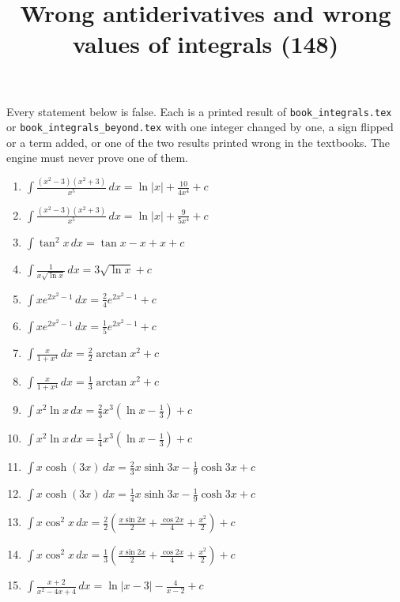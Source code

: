\documentclass[11pt,a4paper]{article}
\title{Wrong antiderivatives and wrong values of integrals (148)}
\author{}
\date{}
\begin{document}
\maketitle
Every statement below is false. Each is a printed result of \texttt{book\_integrals.tex} or \texttt{book\_integrals\_beyond.tex} with one integer changed by one, a sign flipped or a term added, or one of the two results printed wrong in the textbooks. The engine must never prove one of them.

\begin{enumerate}
\item $\displaystyle \int \frac{\left(x^{2} - 3\right)\left(x^{2} + 3\right)}{x^{5}} \, dx = \ln|x| + \frac{10}{4x^{4}} + c$
\item $\displaystyle \int \frac{\left(x^{2} - 3\right)\left(x^{2} + 3\right)}{x^{5}} \, dx = \ln|x| + \frac{9}{5x^{4}} + c$
\item $\displaystyle \int \tan^{2} x \, dx = \tan x - x + x + c$
\item $\displaystyle \int \frac{1}{x\sqrt{\ln x}} \, dx = 3\sqrt{\ln x} + c$
\item $\displaystyle \int x e^{2x^{2} - 1} \, dx = \frac{2}{4}e^{2x^{2} - 1} + c$
\item $\displaystyle \int x e^{2x^{2} - 1} \, dx = \frac{1}{5}e^{2x^{2} - 1} + c$
\item $\displaystyle \int \frac{x}{1 + x^{4}} \, dx = \frac{2}{2}\arctan x^{2} + c$
\item $\displaystyle \int \frac{x}{1 + x^{4}} \, dx = \frac{1}{3}\arctan x^{2} + c$
\item $\displaystyle \int x^{2}\ln x \, dx = \frac{2}{3}x^{3}\left(\ln x - \frac{1}{3}\right) + c$
\item $\displaystyle \int x^{2}\ln x \, dx = \frac{1}{4}x^{3}\left(\ln x - \frac{1}{3}\right) + c$
\item $\displaystyle \int x\cosh\left(3x\right) \, dx = \frac{2}{3}x\sinh 3x - \frac{1}{9}\cosh 3x + c$
\item $\displaystyle \int x\cosh\left(3x\right) \, dx = \frac{1}{4}x\sinh 3x - \frac{1}{9}\cosh 3x + c$
\item $\displaystyle \int x\cos^{2} x \, dx = \frac{2}{2}\left(\frac{x\sin 2x}{2} + \frac{\cos 2x}{4} + \frac{x^{2}}{2}\right) + c$
\item $\displaystyle \int x\cos^{2} x \, dx = \frac{1}{3}\left(\frac{x\sin 2x}{2} + \frac{\cos 2x}{4} + \frac{x^{2}}{2}\right) + c$
\item $\displaystyle \int \frac{x + 2}{x^{2} - 4x + 4} \, dx = \ln|x - 3| - \frac{4}{x - 2} + c$

\end{enumerate}
\end{document}
